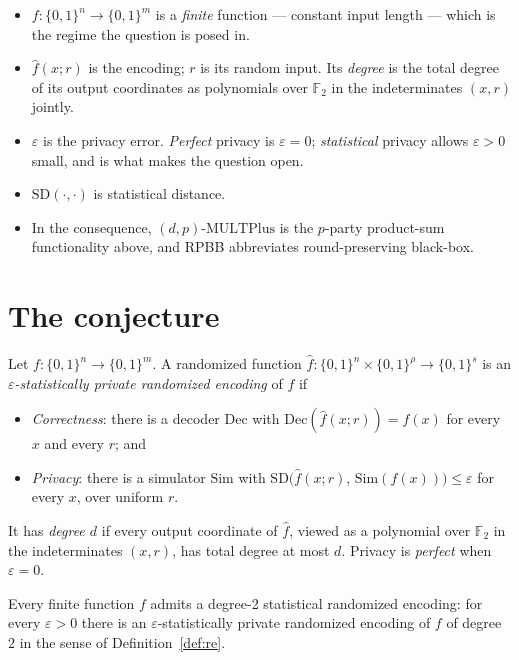 \documentclass{aicr-conjecture}
\newcommand{\bits}{\{0,1\}}
\newcommand{\eps}{\varepsilon}
\newcommand{\SD}{\mathrm{SD}}
\newcommand{\MULT}{\mathrm{MULTPlus}}
\begin{document}
\begin{itemize}[nosep]
  \item $f : \bits^{n} \to \bits^{m}$ is a \emph{finite} function ---
    constant input length --- which is the regime the question is posed
    in.
  \item $\hat f(x; r)$ is the encoding; $r$ is its random input. Its
    \emph{degree} is the total degree of its output coordinates as
    polynomials over $\mathbb{F}_{2}$ in the indeterminates $(x, r)$
    jointly.
  \item $\eps$ is the privacy error. \emph{Perfect} privacy is $\eps = 0$;
    \emph{statistical} privacy allows $\eps > 0$ small, and is what makes
    the question open.
  \item $\SD(\cdot,\cdot)$ is statistical distance.
  \item In the consequence, $(d,p)\text{-}\MULT$ is the $p$-party
    product-sum functionality above, and RPBB abbreviates
    round-preserving black-box.
\end{itemize}

\section{The conjecture}\label{sec:conjectures}

\begin{definition}\label{def:re}
Let $f : \bits^{n} \to \bits^{m}$. A randomized function $\hat f :
\bits^{n} \times \bits^{\rho} \to \bits^{s}$ is an
\emph{$\eps$-statistically private randomized encoding} of $f$ if
\begin{itemize}[nosep]
  \item \emph{Correctness}: there is a decoder $\mathrm{Dec}$ with
    $\mathrm{Dec}(\hat f(x;r)) = f(x)$ for every $x$ and every $r$; and
  \item \emph{Privacy}: there is a simulator $\mathrm{Sim}$ with
    $\SD\bigl(\hat f(x; r),\, \mathrm{Sim}(f(x))\bigr) \le \eps$ for
    every $x$, over uniform $r$.
\end{itemize}
It has \emph{degree $d$} if every output coordinate of $\hat f$, viewed as
a polynomial over $\mathbb{F}_{2}$ in the indeterminates $(x,r)$, has
total degree at most $d$. Privacy is \emph{perfect} when $\eps = 0$.
\end{definition}

\begin{conjecture}\label{conj:main}
Every finite function $f$ admits a degree-2 statistical randomized
encoding: for every $\eps > 0$ there is an $\eps$-statistically private
randomized encoding of $f$ of degree $2$ in the sense of
Definition~\ref{def:re}.
\end{conjecture}
\end{document}
